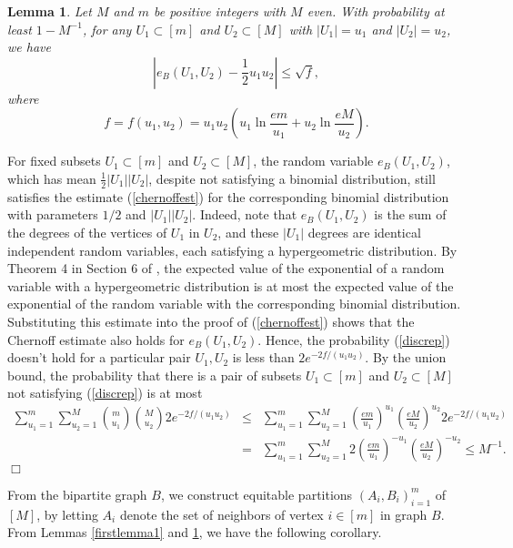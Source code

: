 \documentclass[11pt]{article}
\newtheorem{lemma}{Lemma}[section]
\newenvironment{proof}
      {\medskip\noindent{\bf Proof:}\hspace{1mm}}
      {\hfill$\Box$\medskip}
\begin{document}
\begin{lemma}\label{firstlemma2}
Let $M$ and $m$ be positive integers with $M$ even. With probability at least
$1-M^{-1}$, for any $U_1 \subset [m]$ and $U_2 \subset [M]$ with $|U_1|=u_1$
and $|U_2|=u_2$,
we have
\begin{equation}\label{discrep}|e_B(U_1,U_2)-\frac{1}{2}u_1u_2|\leq\sqrt{f},\end{equation}
where $$f=f(u_1,u_2)=u_1u_2\left(u_1\ln \frac{em}{u_1}+u_2\ln \frac{eM}{u_2}
\right). $$
 \end{lemma}
\begin{proof}
For fixed subsets $U_1 \subset [m]$ and $U_2 \subset [M]$, the random variable
$e_B(U_1,U_2)$, which has mean $\frac{1}{2}|U_1||U_2|$, despite not satisfying a binomial distribution, still satisfies the estimate (\ref{chernoffest}) for the corresponding binomial distribution with parameters $1/2$ and $|U_1||U_2|$. Indeed, note that $e_B(U_1,U_2)$ is the sum of the degrees of the vertices of $U_1$ in $U_2$, and these $|U_1|$ degrees are identical independent random variables, each satisfying a hypergeometric distribution. By Theorem 4 in Section 6 of \cite{Ho}, the expected value of the exponential of a random variable with a hypergeometric distribution is at most the expected value of the exponential of the random variable with the corresponding binomial distribution. Substituting this estimate into the proof of (\ref{chernoffest}) shows that the Chernoff estimate also holds for $e_B(U_1,U_2)$. Hence, the probability
(\ref{discrep}) doesn't hold for a particular pair $U_1,U_2$ is less than
$2e^{-2f/(u_1u_2)}$. By the union bound, the probability that there is a pair
of subsets $U_1 \subset [m]$ and $U_2 \subset [M]$ not satisfying
(\ref{discrep})
is at most
\begin{eqnarray*}\sum_{u_1=1}^m\sum_{u_2=1}^M {m \choose u_1}{M \choose
u_2}2e^{-2f/(u_1u_2)} & \leq &
\sum_{u_1=1}^m\sum_{u_2=1}^M
\left(\frac{em}{u_1}\right)^{u_1}\left(\frac{eM}{u_2}\right)^{u_2}2e^{-2f/(u_1u_2)}
\\ & = & \sum_{u_1=1}^m\sum_{u_2=1}^M 2\left(
\frac{em}{u_1}\right)^{-u_1}\left( \frac{eM}{u_2}\right)^{-u_2} \leq M^{-1}.
\end{eqnarray*}
\end{proof}


From the bipartite graph $B$, we construct equitable partitions
$(A_i,B_i)_{i=1}^m$
of $[M]$, by letting $A_i$ denote the set of neighbors of vertex $i \in [m]$ in
graph $B$. From Lemmas \ref{firstlemma1} and \ref{firstlemma2}, we have the
following corollary.
\end{document}
